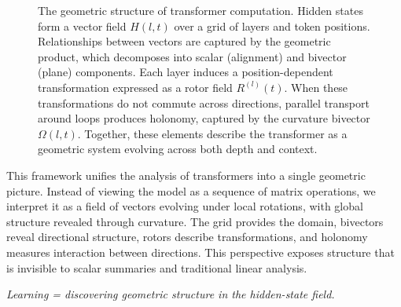 \documentclass[11pt, twoside, openright]{memoir}
\numberwithin{equation}{chapter}
\begin{document}
\begin{figure}[ht]

\caption{The geometric structure of transformer computation.
Hidden states form a vector field $H(l,t)$ over a grid of layers and
token positions.  Relationships between vectors are captured by the
geometric product, which decomposes into scalar (alignment) and
bivector (plane) components.  Each layer induces a
position-dependent transformation expressed as a rotor field
$R^{(l)}(t)$.  When these transformations do not commute across
directions, parallel transport around loops produces holonomy,
captured by the curvature bivector $\Omega(l,t)$.  Together, these
elements describe the transformer as a geometric system evolving
across both depth and context.}
\label{fig:master-geometry}
\end{figure}

\begin{keyidea}
This framework unifies the analysis of transformers into a single
geometric picture.  Instead of viewing the model as a sequence of
matrix operations, we interpret it as a field of vectors evolving
under local rotations, with global structure revealed through curvature.
The grid provides the domain, bivectors reveal directional structure,
rotors describe transformations, and holonomy measures interaction
between directions.  This perspective exposes structure that is invisible
to scalar summaries and traditional linear analysis.

\medskip
\centering
\emph{Learning = discovering geometric structure in the hidden-state field.}
\end{keyidea}


\end{document}
